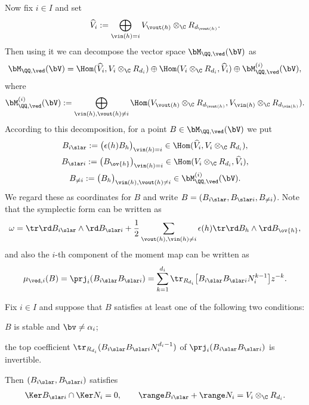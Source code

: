 Now f\/ix $i \in I$ and set
\[
\widehat{V}_i := \bigoplus_{\vin(h)=i}
V_{\vout(h)} \otimes_\C R_{d_{\vout(h)}}.
\]
Then using it we can decompose the vector space $\bM_{\QQ,\ved}(\bV)$ as
\begin{gather}\label{eq:decomposition}
\bM_{\QQ,\ved}(\bV) =\Hom(\widehat{V}_i,V_i \otimes_\C R_{d_i})
\oplus \Hom(V_i \otimes_\C R_{d_i}, \widehat{V}_i)
\oplus \bM^{(i)}_{\QQ,\ved}(\bV),
\end{gather}
where
\[
\bM^{(i)}_{\QQ,\ved}(\bV) := \bigoplus_{\vin(h), \vout(h) \neq i}
\Hom(V_{\vout(h)} \otimes_\C R_{d_{\vout(h)}},
V_{\vin(h)} \otimes_\C R_{d_{\vin(h)}}).
\]
According to this decomposition,
for a point $B \in \bM_{\QQ,\ved}(\bV)$ we put
\begin{gather*}
B_{i \slar}  := \bigl( \epsilon(h) B_h \bigr)_{\vin(h)=i}
\in \Hom(\widehat{V}_i,V_i \otimes_\C R_{d_i}), \\
B_{\slar i}  := \bigl( B_{\ov{h}} \bigr)_{\vin(h)=i}
\in \Hom(V_i \otimes_\C R_{d_i},\widehat{V}_i), \\
B_{\neq i}  := \bigl( B_h \bigr)_{\vin(h), \vout(h) \neq i}
\in \bM^{(i)}_{\QQ,\ved}(\bV).
\end{gather*}
We regard these as coordinates for $B$ and
write $B=(B_{i \slar},B_{\slar i},B_{\neq i})$.
Note that the symplectic form can be written as
\begin{gather}\label{eq:decomposeform}
\omega = \tr \rd B_{i \slar} \wedge \rd B_{\slar i}
+ \frac12 \sum_{\vout(h),\vin(h) \neq i}
\epsilon(h) \tr \rd B_h \wedge \rd B_{\ov{h}},
\end{gather}
and also the $i$-th component of the moment map can be written as
\[
\mu_{\ved,i}(B) = \prj_i (B_{i \slar} B_{\slar i})
= \sum_{k=1}^{d_i}
\tr_{R_{d_i}} \bigl[ B_{i \slar}  B_{\slar i} N_i^{k-1} \bigr]  z^{-k}.
\]

\begin{Lemma}\label{lem:stability}
Fix $i \in I$ and
suppose that $B$ satisfies at least one of the following two conditions:
\begin{enm}
\item $B$ is stable and $\bv \neq \alpha_i$;
\item the top coefficient
$\tr_{R_{d_i}}(B_{i \slar}  B_{\slar i} N_i^{d_i-1})$
of $\prj_i(B_{i \slar}B_{\slar i})$ is invertible.
\end{enm}
Then $(B_{i \slar},B_{\slar i})$ satisfies
\begin{gather}\label{eq:stability}
\Ker B_{\slar i} \cap \Ker N_i =0, \qquad
\range B_{i \slar} + \range N_i = V_i \otimes_\C R_{d_i}.
\end{gather}
\end{Lemma}

